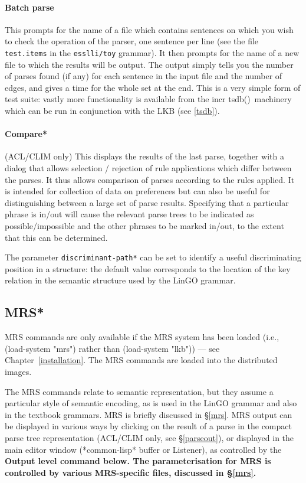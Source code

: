 \documentclass[12pt]{report}
\newcommand{\itsdb}{{\sf \lbrack incr tsdb()\rbrack}}
\newcommand{\filename}[1]{{\tt #1}}
\newcommand{\lkbparam}[1]{{\tt #1}}
\newcommand{\lkbmenucommand}{\bf}
\begin{document}
\paragraph{Batch parse}
This prompts for the name of a file which contains sentences
on which you wish to check the operation of the parser,
one sentence per line (see the file \filename{test.items} in the
\filename{esslli/toy} grammar).  It then prompts for the name of a new file
to which the results will be output.  
The output simply tells you
the number of parses found (if any) for each sentence in the
input file and the number
of edges, and gives a time for the whole set at the end.
This is a very simple form of test suite: vastly 
more functionality is available from the \itsdb\ machinery which
can be run in conjunction with the LKB (see \ref{tsdb}).

\paragraph{Compare*}
(ACL/CLIM only)
This displays the results of the last parse, together with a dialog that 
allows selection / rejection of rule applications which differ between 
the parses.
It thus allows comparison of parses according to the rules applied.
It is intended for collection of data on preferences
but can also be useful for distinguishing between a large set of
parse results.  Specifying that a particular phrase is in/out will 
cause the relevant parse trees to be indicated as possible/impossible
and the other phrases to be marked in/out, to the extent that this can
be determined.  

The parameter \lkbparam{*discriminant-path*} can be set to
identify a useful discriminating position in a structure: the
default value corresponds to the location of the key relation
in the semantic structure used by the LinGO grammar.

\subsection{MRS*}
\label{mrsmenu}

MRS commands are only available if the MRS system has been loaded
(i.e., (load-system "mrs") rather than (load-system "lkb")) --- see
Chapter~\ref{installation}.  The MRS commands are loaded into the 
distributed images.

The MRS commands relate to semantic representation, but they assume 
a particular style of semantic encoding, as is used in the LinGO grammar
and also in the textbook grammars.  MRS is 
briefly discussed in \S\ref{mrs}.  MRS output can be displayed in
various ways by clicking on the result of a parse in the compact parse tree
representation (ACL/CLIM only, see \S\ref{parseout}), 
or displayed in the main editor window
(*common-lisp* buffer or Listener), as controlled by the 
\lkbmenucommand{Output level}
command below.  The parameterisation for MRS is 
controlled by various MRS-specific files,
discussed in \S\ref{mrs}.
\end{document}
